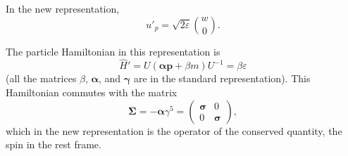 In the new representation,
\begin{equation}
u'_p = \sqrt{2\varepsilon}\binom{w}{0}.
\tag{23.17}
\end{equation}

The particle Hamiltonian in this representation is
\begin{equation}
\widehat H' = U(\boldsymbol{\alpha}\mathbf{p} + \beta m)U^{-1} = \beta\varepsilon
\tag{23.18}
\end{equation}
(all the matrices $\beta$, $\boldsymbol{\alpha}$, and $\boldsymbol{\gamma}$ are in the standard representation). This Hamiltonian commutes with the matrix
\[
\boldsymbol{\Sigma} = -\boldsymbol{\alpha}\gamma^5 = \begin{pmatrix} \boldsymbol{\sigma} & 0\\ 0 & \boldsymbol{\sigma} \end{pmatrix},
\]
which in the new representation is the operator of the conserved quantity, the spin in the rest frame.
